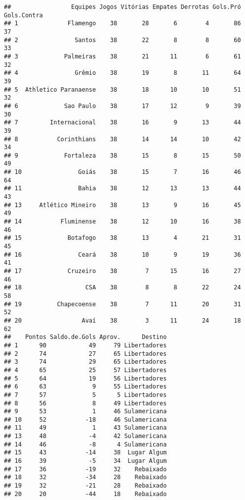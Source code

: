 \documentclass[
]{book}
\begin{document}
\begin{verbatim}
##                 Equipes Jogos Vitórias Empates Derrotas Gols.Pró Gols.Contra
## 1              Flamengo    38       28       6        4       86          37
## 2                Santos    38       22       8        8       60          33
## 3             Palmeiras    38       21      11        6       61          32
## 4                Grêmio    38       19       8       11       64          39
## 5  Athletico Paranaense    38       18      10       10       51          32
## 6             Sao Paulo    38       17      12        9       39          30
## 7         Internacional    38       16       9       13       44          39
## 8           Corinthians    38       14      14       10       42          34
## 9             Fortaleza    38       15       8       15       50          49
## 10                Goiás    38       15       7       16       46          64
## 11                Bahia    38       12      13       13       44          43
## 13     Atlético Mineiro    38       13       9       16       45          49
## 14           Fluminense    38       12      10       16       38          46
## 15             Botafogo    38       13       4       21       31          45
## 16                Ceará    38       10       9       19       36          41
## 17             Cruzeiro    38        7      15       16       27          46
## 18                  CSA    38        8       8       22       24          58
## 19          Chapecoense    38        7      11       20       31          52
## 20                 Avaí    38        3      11       24       18          62
##    Pontos Saldo.de.Gols Aprov.      Destino
## 1      90            49     79 Libertadores
## 2      74            27     65 Libertadores
## 3      74            29     65 Libertadores
## 4      65            25     57 Libertadores
## 5      64            19     56 Libertadores
## 6      63             9     55 Libertadores
## 7      57             5      5 Libertadores
## 8      56             8     49 Libertadores
## 9      53             1     46 Sulamericana
## 10     52           -18     46 Sulamericana
## 11     49             1     43 Sulamericana
## 13     48            -4     42 Sulamericana
## 14     46            -8      4 Sulamericana
## 15     43           -14     38  Lugar Algum
## 16     39            -5     34  Lugar Algum
## 17     36           -19     32    Rebaixado
## 18     32           -34     28    Rebaixado
## 19     32           -21     28    Rebaixado
## 20     20           -44     18    Rebaixado
\end{verbatim}
\end{document}
